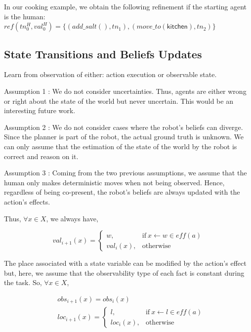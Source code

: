 In our cooking example, we obtain the following refinement if the starting agent is the human:\\
{\small
$\textit{ref}(tn^H_0, val^H_0) = \{ (add\_salt(),tn_1), (move\_to(\textsf{kitchen}),tn_2) \}$
}


    \subsection{State Transitions and Beliefs Updates}
Learn from observation of either: action execution or observable state.

Assumption 1 : We do not consider uncertainties. Thus, agents are either wrong or right about the state of the world but never uncertain. This would be an interesting future work. 

Assumption 2 : We do not consider cases where the robot's beliefs can diverge. Since the planner is part of the robot, the actual ground truth is unknown. We can only assume that the estimation of the state of the world by the robot is correct and reason on it.

Assumption 3 : Coming from the two previous assumptions, we assume that the human only makes deterministic moves when not being observed. Hence, regardless of being co-present, the robot's beliefs are always updated with the action's effects.


Thus, $\forall x \in X$, we always have,

\begin{equation}
    val_{i+1}(x) = \left\{ 
    \begin{array}{ll}
        w, & \mbox{if} ~ x \leftarrow w \in \textit{eff}(a)   \\ 
        val_i(x), & \mbox{otherwise}
    \end{array}\right.
\end{equation}

The place associated with a state variable can be modified by the action's effect but, here, we assume that the observability type of each fact is constant during the task. So, $\forall x \in X$,

\begin{align}
    &obs_{i+1}(x) = obs_i(x)\\
    &loc_{i+1}(x) = \left\{ 
    \begin{array}{ll}
        l, & \mbox{if} ~ x \leftarrow l \in \textit{eff}(a)\\
        loc_i(x), & \mbox{otherwise}
    \end{array}\right.
\end{align}

